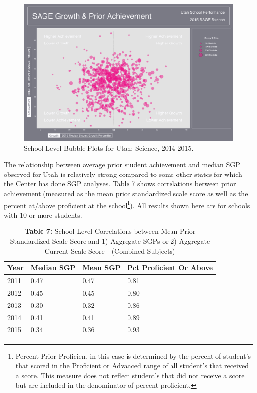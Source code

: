 \documentclass[12pt]{article}
\begin{document}
\begin{figure}[htbp]
\centering
\includegraphics{../img/Bubble_Plots/2015/State/Style_1/Utah_2015_Science_State_Bubble_Plot_(Prior_Achievement).png}
\caption{School Level Bubble Plots for Utah: Science, 2014-2015.}
\end{figure}

The relationship between average prior student achievement and median
SGP observed for Utah is relatively strong compared to some other states
for which the Center has done SGP analyses. Table 7 shows correlations
between prior achievement (measured as the mean prior standardized scale
score as well as the percent at/above proficient at the school\footnote{Percent
  Prior Proficient in this case is determined by the percent of
  student's that scored in the Proficient or Advanced range of all
  student's that received a score. This measure does not reflect
  student's that did not receive a score but are included in the
  denominator of percent proficient.}). All results shown here are for
schools with 10 or more students.

\begin{table}[H]
\caption*{\textbf{Table 7:} School Level Correlations between Mean Prior Standardized Scale Score and 1) Aggregate SGPs or 2) Aggregate Current Scale Score - (Combined Subjects)\label{table7}} 
\begin{center}
\begin{tabular}{llll}
\hline\hline
\multicolumn{1}{c}{Year}&\multicolumn{1}{c}{Median SGP}&\multicolumn{1}{c}{Mean SGP}&\multicolumn{1}{c}{Pct Proficient Or Above}\tabularnewline
\hline
2011&0.47&0.47&0.81\tabularnewline
2012&0.45&0.45&0.80\tabularnewline
2013&0.30&0.32&0.86\tabularnewline
2014&0.41&0.41&0.89\tabularnewline
2015&0.34&0.36&0.93\tabularnewline
\hline
\end{tabular}\end{center}

\end{table}
\end{document}
